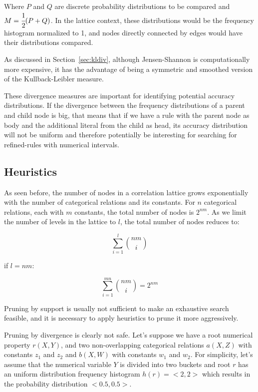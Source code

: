 Where $P$ and $Q$ are discrete probability distributions to be compared and $M=\cfrac{1}{2}(P+Q)$. In the lattice
context, these distributions would be the frequency histogram normalized to 1, and nodes directly connected by edges
would have their distributions compared.

As discussed in Section~\ref{sec:kldiv}, although Jensen-Shannon is computationally more expensive, it has the advantage
of being a symmetric and smoothed version of the Kullback-Leibler measure. 

These divergence measures are important for identifying potential accuracy distributions. If the divergence between the
frequency distributions of a parent and child node is big, that means that if we have a rule with the parent node as
body and the additional literal from the child as head, its accuracy distribution will not be uniform and therefore
potentially be interesting for searching for refined-rules with numerical intervals.


\subsection{Heuristics}
\label{sec:heuristics}

As seen before, the number of nodes in a correlation lattice grows exponentially with the number of categorical
relations and its constants. For $n$ categorical relations, each with $m$ constants, the total number of nodes is
$2^{nm}$. As we limit the number of levels in the lattice to $l$, the total number of nodes reduces to:

\begin{center}
  \begin{equation}
    \sum_{i=1}^{l}\binom{nm}{i}
  \end{equation}
\end{center}

if $l=nm$:

\begin{center}
  \begin{equation}
    \sum_{i=1}^{mn}\binom{nm}{i} = 2^{nm}
  \end{equation}
\end{center}


Pruning by support is usually not sufficient to make an exhaustive search feasible, and it is necessary to apply
heuristics to prune it more aggressively.


Pruning by divergence is clearly not safe. Let's suppose we have a root numerical property $r(X,Y)$, and two
non-overlapping categorical relations $a(X,Z)$ with constants $z_1$ and $z_2$ and $b(X,W)$ with constants $w_1$ and
$w_2$. For simplicity, let's assume that the numerical variable $Y$ is divided into two buckets and root $r$ has an
uniform distribution frequency histogram $h(r)=<2,2>$ which results in the probability distribution $<0.5,0.5>$.

